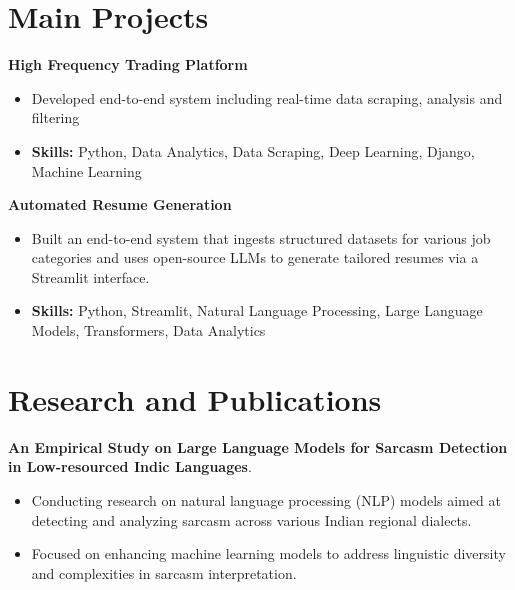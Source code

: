 \documentclass[a4paper,11pt]{article}
\begin{document}
\section{\textbf{Main Projects}}

\vspace{1mm}
  \textbf{High Frequency Trading Platform  }
\vspace{-1.5mm} %
\begin{itemize}
  \item Developed end-to-end system including real-time data scraping, analysis and filtering
\vspace{-3mm}
  \item \textbf{Skills:} Python, Data Analytics, Data Scraping, Deep Learning, Django, Machine Learning
\end{itemize}


\vspace{1mm}
   \textbf{Automated Resume Generation }
\vspace{-1.5mm} %
\begin{itemize}
  \item Built an end-to-end system that ingests structured datasets for various job categories and uses open-source LLMs to generate tailored resumes via a Streamlit interface.
\vspace{-3mm}
  \item \textbf{Skills:} Python, Streamlit, Natural Language Processing, Large Language Models, Transformers, Data Analytics
\end{itemize}



\section{\textbf{Research and Publications} \hfill }
\vspace{1mm}
  \textbf{An Empirical Study on Large Language Models for Sarcasm Detection in Low-resourced Indic Languages}.
\vspace{-1mm} %
\begin{itemize}
  \item Conducting research on natural language processing (NLP) models aimed at detecting and analyzing sarcasm across various Indian regional dialects.
\vspace{-3mm}
  \item Focused on enhancing machine learning models to address linguistic diversity and complexities in sarcasm interpretation.
\end{itemize}
\end{document}
